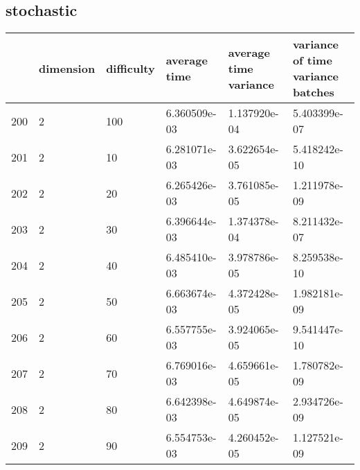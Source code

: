\documentclass{article}
\begin{document}
\subsection{stochastic}
\begin{center}
\begin{tabular}{llllll}
\toprule
{} & dimension & difficulty &  average time & average time variance & variance of time variance batches \\
\midrule
200 &         2 &        100 &  6.360509e-03 &          1.137920e-04 &                      5.403399e-07 \\
201 &         2 &         10 &  6.281071e-03 &          3.622654e-05 &                      5.418242e-10 \\
202 &         2 &         20 &  6.265426e-03 &          3.761085e-05 &                      1.211978e-09 \\
203 &         2 &         30 &  6.396644e-03 &          1.374378e-04 &                      8.211432e-07 \\
204 &         2 &         40 &  6.485410e-03 &          3.978786e-05 &                      8.259538e-10 \\
205 &         2 &         50 &  6.663674e-03 &          4.372428e-05 &                      1.982181e-09 \\
206 &         2 &         60 &  6.557755e-03 &          3.924065e-05 &                      9.541447e-10 \\
207 &         2 &         70 &  6.769016e-03 &          4.659661e-05 &                      1.780782e-09 \\
208 &         2 &         80 &  6.642398e-03 &          4.649874e-05 &                      2.934726e-09 \\
209 &         2 &         90 &  6.554753e-03 &          4.260452e-05 &                      1.127521e-09 \\
\bottomrule
\end{tabular}
\end{center}
\end{document}
